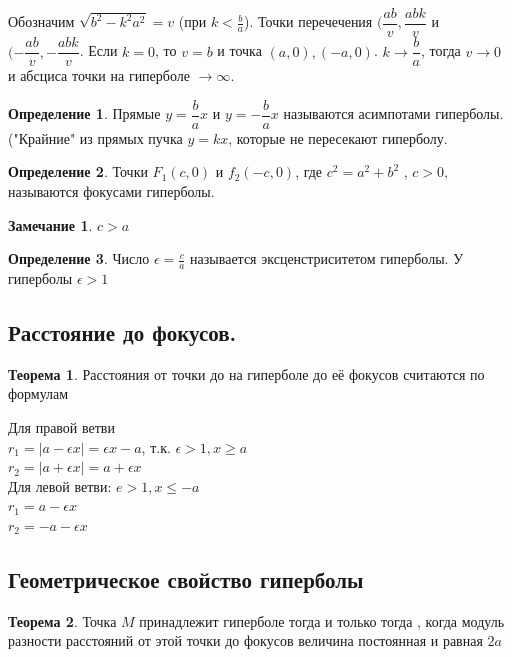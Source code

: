 \documentclass{article}
\theoremstyle{definition}
\newtheorem{definition}{Определение}
\newtheorem{theorem}{Теорема}[section]
\newtheorem{remark}{Замечание}
\begin{document}
Обозначим $\sqrt{b^2 - k^2 a^2} = v$ (при $k < \frac{b}{a}$). Точки перечечения $(\dfrac{a b}{v}, \dfrac{a b k}{v}$ и $(-\dfrac{a b}{v}, -\dfrac{a b k}{v}$.
Если $k = 0$, то $v = b$ и точка $(a, 0), (-a, 0)$. $k \rightarrow \dfrac{b}{a}$, тогда $v \rightarrow 0$ и абсциса точки на гиперболе $\to \infty$.

\begin{definition}

Прямые $y = \dfrac{b}{a} x$ и $y = - \dfrac{b}{a} x$ называются асимпотами гиперболы. ("Крайние" из прямых пучка $y = k x$, которые не пересекают гиперболу.
\end{definition} 

\begin{definition} Точки $F_1(c, 0)$ и $f_2(-c, 0)$, где $c^2 = a^2 + b^2$ , $c > 0,$ называются фокусами гиперболы.
\end{definition}
\begin{remark} $c > a$
\end{remark}
\begin{definition}
Число $\epsilon = \frac{c}{a}$ называется эксценстриситетом гиперболы. У гиперболы $\epsilon > 1$
\end{definition}

\subsection{Расстояние до фокусов.}
\begin{theorem} Расстояния от точки до на гиперболе до её фокусов считаются по формулам 

Для правой ветви
\\ $r_1 = |a - \epsilon x| = \epsilon x - a$, т.к. $\epsilon > 1, x \geqslant a$ 
\\$r_2 = |a + \epsilon x| = a + \epsilon x$
\\ Для левой ветви:
$e > 1, x \leqslant -a $
\\$r_1 = a - \epsilon x$
\\$r_2 = - a - \epsilon x$
\end{theorem}

\subsection{Геометрическое свойство гиперболы}
\begin{theorem}
Точка $M$ принадлежит гиперболе тогда и только тогда , когда модуль разности расстояний от этой точки до фокусов величина постоянная и равная $2 a$
\end{theorem} 
\end{document}
